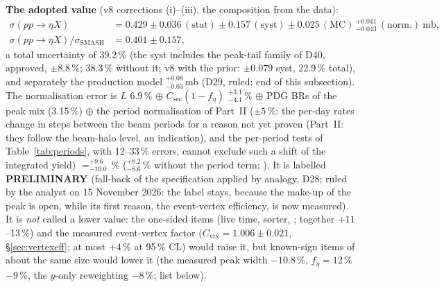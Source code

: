 \documentclass[11pt,a4paper]{article}
\newcommand{\code}[1]{\texttt{\detokenize{#1}}}
\newcommand{\Csec}{\ensuremath{C_{\mathrm{sec}}}\xspace}
\newcommand{\feta}{\ensuremath{f_\eta}\xspace}
\begin{document}
\textbf{The adopted value} (v8 corrections (i)--(iii), the composition from the data):
\begin{align}
\sigma(pp\to\eta X)&=0.429\pm0.036\,(\mathrm{stat})\pm0.157\,(\mathrm{syst})\pm0.025\,(\mathrm{MC})\,^{+0.041}_{-0.043}\,(\mathrm{norm.})\ \mathrm{mb},\nonumber\\
\sigma(pp\to\eta X)/\sigma_{\mathrm{SMASH}}&=0.401\pm0.157,
\end{align}
a total uncertainty of 39.2\,\% (the syst includes the peak-tail family of D40, approved, $\pm8.8$\,\%; 38.3\,\% without it; v8 with the prior: $\pm0.079$ syst, 22.9\,\% total), and separately the production model
$^{+0.08}_{-0.03}$\,mb (D29, ruled; end of this subsection). The normalisation error is $L$ 6.9\,\% $\oplus$
$\Csec(1-\feta)$ $^{+3.1}_{-4.1}$\,\% $\oplus$ PDG BRs of the peak mix (3.15\,\%) $\oplus$ the period normalisation of Part~II ($\pm5$\,\%: the
per-day rates change in steps between the beam periods for a reason not yet proven (Part~II: they follow the beam-halo level, an
indication), and the per-period tests of Table~\ref{tab:periods}, with
12--33\,\% errors, cannot exclude such a shift of the integrated yield) $=^{+9.6}_{-10.0}$\,\% ($^{+8.2}_{-8.6}$\,\% without the period term;
\code{fix2_numbers.txt}). It is labelled \textbf{PRELIMINARY} (fall-back of the specification applied by analogy, D28; ruled by the analyst on 15 November 2026: the
label stays, because the make-up of the peak is open, while its first reason, the event-vertex efficiency, is now measured). It is \emph{not}
called a lower value: the one-sided items (live time, sorter, \code{cor_ok}; together $+11$--13\,\%) and the measured event-vertex factor
($C_{\mathrm{vtx}}=1.006\pm0.021$, \S\ref{sec:vertexeff}; at most $+4$\,\% at 95\,\% CL) would raise it, but known-sign items of about the same
size would lower it (the measured peak width $-10.8$\,\%, $\feta=12$\,\% $-9$\,\%, the $y$-only reweighting $-8$\,\%; list below).
\end{document}
